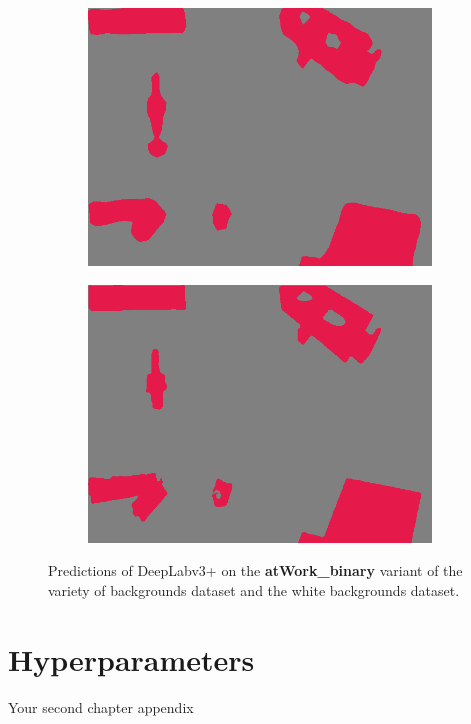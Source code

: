 \begin{figure}[h]
\begin{subfigure}{.24\textwidth}
			\includegraphics[width=1\linewidth]{images/sample_predictions/00017_mob_binary_pred}
		\end{subfigure}
		\begin{subfigure}{.24\textwidth}
			\centering
			\includegraphics[width=1\linewidth]{images/sample_predictions/00017_xcep_binary_pred}
		\end{subfigure}
		\caption{Predictions of DeepLabv3+ on the \textbf{atWork\_binary} variant of the variety of backgrounds dataset and the white backgrounds dataset.}
		\label{Fig:sam_bin}
	\end{figure}

\chapter{Hyperparameters}
Your second chapter appendix
